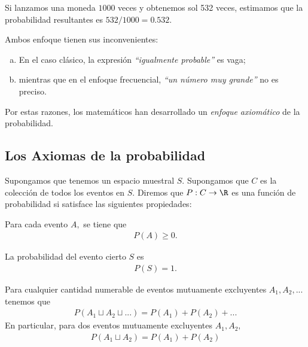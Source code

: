 {}
\begin{exmp}
 \label{exmp:1.11}
 Si lanzamos una moneda $1000$ veces y obtenemos sol 532 veces, estimamos que la probabilidad resultantes es $532/1000=0.532$.
\end{exmp}



 \begin{rem}
  Ambos enfoque tienen sus inconvenientes:
  \begin{enumerate}[(a)]
   \item En el caso clásico, la expresión \emph{``igualmente probable''} es vaga; 
   \item mientras que en el enfoque frecuencial, \emph{``un número muy grande''} no es preciso. 
  \end{enumerate}
Por estas razones, los matemáticos han desarrollado un \emph{enfoque axiomático} de la probabilidad.
 \end{rem}


\subsection{Los Axiomas de la probabilidad}
{}
Supongamos que tenemos un espacio muestral $S.$ Supongamos que $C$ es la colección de todos los eventos en $S.$ Diremos que $P:C \to \R$ es una función de probabilidad si satisface las siguientes propiedades:



\begin{axiom}
   Para cada evento $A,$ se tiene que
   \begin{align}
   \label{1.1}
    P(A)\geq 0.
   \end{align}

\end{axiom}



\begin{axiom}
   La probabilidad del evento cierto $S$ es
   \begin{align}
   \label{1.2}
    P(S)=1.
   \end{align}
\end{axiom}



\begin{axiom}
  Para cualquier cantidad numerable de eventos mutuamente excluyentes
  $A_{1},A_{2},...$ tenemos que
  \begin{align}
   \label{1.3}
   P(A_{1}\sqcup A_{2} \sqcup ...)=P(A_{1})+P(A_{2})+...
  \end{align}
En particular, para dos eventos mutuamente excluyentes $A_{1},A_{2},$
\begin{align}
	\label{1.4}
 P(A_{1}\sqcup A_{2})=P(A_{1})+P(A_{2})
\end{align}

\end{axiom}


